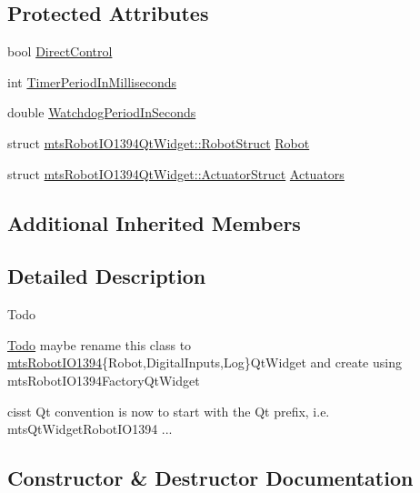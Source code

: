 \subsection*{Protected Attributes}
\begin{DoxyCompactItemize}
\item 
bool \hyperlink{classmts_robot_i_o1394_qt_widget_ae0e6af9087d5457633b4d42a93c63bcd}{Direct\+Control}
\item 
int \hyperlink{classmts_robot_i_o1394_qt_widget_a4fa3dd1b6769a8a4fc0c51b77dbf3413}{Timer\+Period\+In\+Milliseconds}
\item 
double \hyperlink{classmts_robot_i_o1394_qt_widget_a65cefe450636651de5c971d33119c6db}{Watchdog\+Period\+In\+Seconds}
\item 
struct \hyperlink{structmts_robot_i_o1394_qt_widget_1_1_robot_struct}{mts\+Robot\+I\+O1394\+Qt\+Widget\+::\+Robot\+Struct} \hyperlink{classmts_robot_i_o1394_qt_widget_ade381e042472af642876b731415a18af}{Robot}
\item 
struct \hyperlink{structmts_robot_i_o1394_qt_widget_1_1_actuator_struct}{mts\+Robot\+I\+O1394\+Qt\+Widget\+::\+Actuator\+Struct} \hyperlink{classmts_robot_i_o1394_qt_widget_a68401b5200788155540f952697487364}{Actuators}
\end{DoxyCompactItemize}
\subsection*{Additional Inherited Members}


\subsection{Detailed Description}
\begin{DoxyRefDesc}{Todo}
\item[\hyperlink{todo__todo000019}{Todo}]maybe rename this class to \hyperlink{classmts_robot_i_o1394}{mts\+Robot\+I\+O1394}\{Robot,Digital\+Inputs,Log\}Qt\+Widget and create using mts\+Robot\+I\+O1394\+Factory\+Qt\+Widget 

cisst Qt convention is now to start with the Qt prefix, i.\+e. mts\+Qt\+Widget\+Robot\+I\+O1394 ... \end{DoxyRefDesc}


\subsection{Constructor \& Destructor Documentation}
\hypertarget{classmts_robot_i_o1394_qt_widget_a543c42d3fa7318d97d89c1936d5ca743}{}
